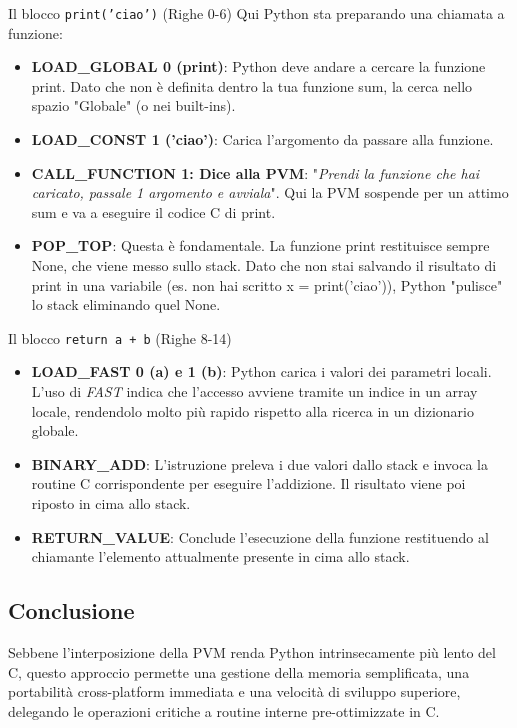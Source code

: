 \documentclass[a4paper,12pt]{article}
\begin{document}
Il blocco \texttt{print('ciao')} (Righe 0-6)
Qui Python sta preparando una chiamata a funzione:
\begin{itemize}
    \item \textbf{LOAD\_GLOBAL 0 (print)}: Python deve andare a cercare la funzione print. Dato che non è definita dentro la tua funzione sum, la cerca nello spazio "Globale" (o nei built-ins).
    \item \textbf{LOAD\_CONST 1 ('ciao')}: Carica l'argomento da passare alla funzione.
    \item \textbf{CALL\_FUNCTION 1: Dice alla PVM}: "\textit{Prendi la funzione che hai caricato, passale 1 argomento e avviala}". Qui la PVM sospende per un attimo sum e va a eseguire il codice C di print.
    \item \textbf{POP\_TOP}: Questa è fondamentale. La funzione print restituisce sempre None, che viene messo sullo stack. Dato che non stai salvando il risultato di print in una variabile (es. non hai scritto x = print('ciao')),
    Python "pulisce" lo stack eliminando quel None.
\end{itemize}

Il blocco \texttt{return a + b} (Righe 8-14)
\begin{itemize}
    \item \textbf{LOAD\_FAST 0 (a) e 1 (b)}: Python carica i valori dei parametri locali. L'uso di \textit{FAST} indica che l'accesso avviene tramite un indice in un array locale, rendendolo molto più rapido rispetto alla ricerca in un dizionario globale.
    \item \textbf{BINARY\_ADD}: L'istruzione preleva i due valori dallo stack e invoca la routine C corrispondente per eseguire l'addizione. Il risultato viene poi riposto in cima allo stack.
    \item \textbf{RETURN\_VALUE}: Conclude l'esecuzione della funzione restituendo al chiamante l'elemento attualmente presente in cima allo stack.
\end{itemize}





\subsection{Conclusione}
Sebbene l'interposizione della PVM renda Python intrinsecamente più lento del C, questo approccio permette una gestione della memoria semplificata, una portabilità cross-platform immediata e una velocità di sviluppo superiore, delegando le operazioni critiche a routine interne pre-ottimizzate in C.
\end{document}
